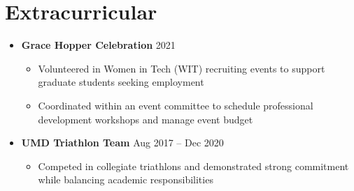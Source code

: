 \documentclass[letterpaper,11pt]{article}
\newcommand{\sectionStart}{\begin{itemize}[leftmargin=0in, label={}]}
\newcommand{\sectionEnd}{\end{itemize}\vspace{-8pt}}
\newcommand{\singleHeading}[2]{
  \item
    #1 \hspace*{\fill} #2 \\
    \vspace{-6pt}
}
\newcommand{\itemListStart}{\begin{itemize}}
\newcommand{\itemListEnd}{\end{itemize}\vspace{-12pt}}
\newcommand{\resumeItem}[1]{
  \item
    \small #1
    \vspace{-3pt} %
}
\begin{document}
  \section{Extracurricular}
    \sectionStart
      \singleHeading{\textbf{Grace Hopper Celebration}}{2021}
        \itemListStart
          \resumeItem{Volunteered in Women in Tech (WIT) recruiting events to support graduate students seeking employment}
          \resumeItem{Coordinated within an event committee to schedule professional development workshops and manage event budget}
        \itemListEnd
      \singleHeading{\textbf{UMD Triathlon Team}}{Aug 2017 -- Dec 2020}
        \itemListStart
          \resumeItem{Competed in collegiate triathlons and demonstrated strong commitment while balancing academic responsibilities}
        \itemListEnd
    \sectionEnd
\end{document}

